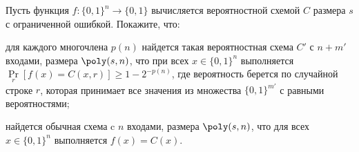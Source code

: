 Пусть функция $f\colon \{0, 1\}^n \to \{0, 1\}$ вычисляется вероятностной схемой $C$ размера $s$ с
ограниченной ошибкой. Покажите, что:
\begin{enumcyr}
    \item для каждого многочлена $p(n)$ найдется такая вероятностная схема $C'$ с $n + m'$ входами,
        размера $\poly(s, n)$, что при всех $x \in \{0, 1\}^n$ выполняется
        $\Pr\limits_{r}[f(x) = C(x, r)] \ge 1 - 2^{-p(n)}$, где вероятность берется по случайной строке
        $r$, которая принимает все значения из множества $\{0, 1\}^{m'}$ с равными вероятностями;
    \item найдется обычная схема c $n$ входами, размера $\poly(s, n)$, что для
        всех $x \in \{0, 1\}^n$ выполняется $f(x) = C(x)$.
\end{enumcyr}
